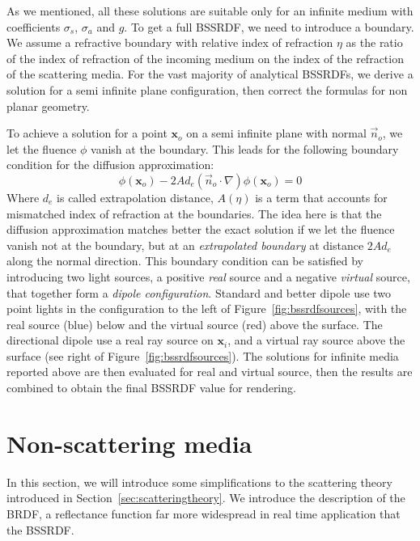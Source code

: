 As we mentioned, all these solutions are suitable only for an infinite medium with coefficients $\sigma_s$, $\sigma_a$ and $g$. To get a full BSSRDF, we need to introduce a boundary. We assume a refractive boundary with relative index of refraction $\eta$ as the ratio of the index of refraction of the incoming medium on the index of the refraction of the scattering media. For the vast majority of analytical BSSRDFs, we derive a solution for a semi infinite plane configuration, then correct the formulas for non planar geometry.

To achieve a solution for a point $\mathbf{x}_o$ on a semi infinite plane with normal $\vec{n}_o$, we let the fluence $\phi$ vanish at the boundary. This leads for the following boundary condition for the diffusion approximation: 
\begin{equation*}
\phi(\mathbf{x}_o) - 2 A d_e (\vec{n}_o \cdot \nabla) \phi(\mathbf{x}_o) = 0
\end{equation*}
Where $d_e$ is called extrapolation distance, $A(\eta)$ is a term that accounts for mismatched index of refraction at the boundaries. The idea here is that the diffusion approximation matches better the exact solution if we let the fluence vanish not at the boundary, but at an \emph{extrapolated boundary} at distance $2 A d_e$ along the normal direction. This boundary condition can be satisfied by introducing two light sources, a positive \emph{real} source and a negative \emph{virtual} source, that together form a \emph{dipole configuration}.  Standard and better dipole use two point lights in the configuration to the left of Figure~\ref{fig:bssrdfsources}, with the real source (blue) below and the virtual source (red) above the surface. The directional dipole use a real ray source on $\mathbf{x}_i$, and a virtual ray source above the surface (see right of Figure~\ref{fig:bssrdfsources}). The solutions for infinite media reported above are then evaluated for real and virtual source, then the results are combined to obtain the final BSSRDF value for rendering. 

\section{Non-scattering media}
\label{sec:brdftheory}
In this section, we will introduce some simplifications to the scattering theory introduced in Section~\ref{sec:scatteringtheory}. We introduce the description of the BRDF, a reflectance function far more widespread in real time application that the BSSRDF.   

